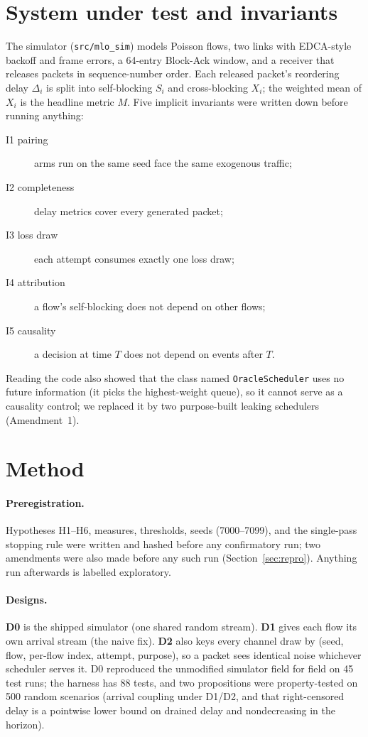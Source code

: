 \documentclass[11pt]{article}
\begin{document}
\section{System under test and invariants}
The simulator (\texttt{src/mlo\_sim}) models Poisson flows, two links with EDCA-style backoff and frame errors, a 64-entry Block-Ack window, and a receiver that releases packets in sequence-number order.
Each released packet's reordering delay $\Delta_i$ is split into self-blocking $S_i$ and cross-blocking $X_i$; the weighted mean of $X_i$ is the headline metric $M$.
Five implicit invariants were written down before running anything:
\begin{description}
  \item[I1 pairing] arms run on the same seed face the same exogenous traffic;
  \item[I2 completeness] delay metrics cover every generated packet;
  \item[I3 loss draw] each attempt consumes exactly one loss draw;
  \item[I4 attribution] a flow's self-blocking does not depend on other flows;
  \item[I5 causality] a decision at time $T$ does not depend on events after $T$.
\end{description}
Reading the code also showed that the class named \texttt{OracleScheduler} uses no future information (it picks the highest-weight queue), so it cannot serve as a causality control; we replaced it by two purpose-built leaking schedulers (Amendment~1).

\section{Method}
\paragraph{Preregistration.} Hypotheses H1--H6, measures, thresholds, seeds (7000--7099), and the single-pass stopping rule were written and hashed before any confirmatory run; two amendments were also made before any such run (Section~\ref{sec:repro}). Anything run afterwards is labelled exploratory.

\paragraph{Designs.} \textbf{D0} is the shipped simulator (one shared random stream). \textbf{D1} gives each flow its own arrival stream (the naive fix). \textbf{D2} also keys every channel draw by (seed, flow, per-flow index, attempt, purpose), so a packet sees identical noise whichever scheduler serves it. D0 reproduced the unmodified simulator field for field on 45 test runs; the harness has 88 tests, and two propositions were property-tested on 500 random scenarios (arrival coupling under D1/D2, and that right-censored delay is a pointwise lower bound on drained delay and nondecreasing in the horizon).
\end{document}
